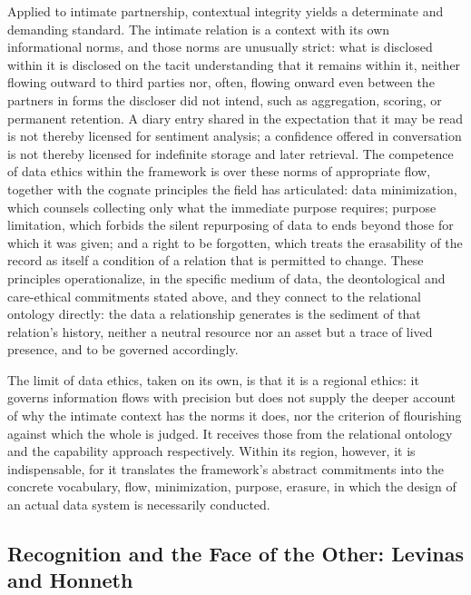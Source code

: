 Applied to intimate partnership, contextual integrity yields a determinate and demanding standard. The intimate relation is a context with its own informational norms, and those norms are unusually strict: what is disclosed within it is disclosed on the tacit understanding that it remains within it, neither flowing outward to third parties nor, often, flowing onward even between the partners in forms the discloser did not intend, such as aggregation, scoring, or permanent retention. A diary entry shared in the expectation that it may be read is not thereby licensed for sentiment analysis; a confidence offered in conversation is not thereby licensed for indefinite storage and later retrieval. The competence of data ethics within the framework is over these norms of appropriate flow, together with the cognate principles the field has articulated: data minimization, which counsels collecting only what the immediate purpose requires; purpose limitation, which forbids the silent repurposing of data to ends beyond those for which it was given; and a right to be forgotten, which treats the erasability of the record as itself a condition of a relation that is permitted to change. These principles operationalize, in the specific medium of data, the deontological and care-ethical commitments stated above, and they connect to the relational ontology directly: the data a relationship generates is the sediment of that relation's history, neither a neutral resource nor an asset but a trace of lived presence, and to be governed accordingly.

The limit of data ethics, taken on its own, is that it is a regional ethics: it governs information flows with precision but does not supply the deeper account of why the intimate context has the norms it does, nor the criterion of flourishing against which the whole is judged. It receives those from the relational ontology and the capability approach respectively. Within its region, however, it is indispensable, for it translates the framework's abstract commitments into the concrete vocabulary, flow, minimization, purpose, erasure, in which the design of an actual data system is necessarily conducted.

\subsection{Recognition and the Face of the Other: Levinas and Honneth}\label{p01:sec:recognition}

